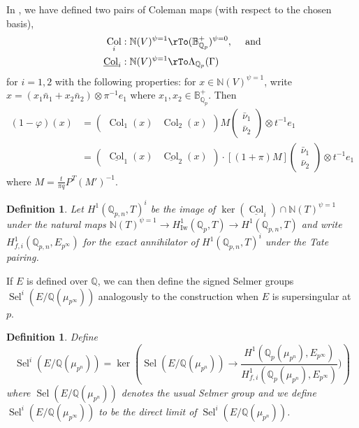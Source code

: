 \documentclass{amsart}
\newcommand{\QQ}{\mathbb Q}
\newcommand{\BB}{\mathbb B}
\newcommand{\NN}{\mathbb N}
\DeclareMathOperator{\Sel}{Sel}
\DeclareMathOperator{\Iw}{Iw}
\DeclareMathOperator{\Col}{Col}
\newcommand{\Ep}{E_{p^\infty}}
\newcommand{\Qp}{\QQ_p}
\newcommand{\vp}{\varphi}
\newtheorem{definition}[theorem]{Definition}
\begin{document}
    In \cite{leiloefflerzerbes10}, we have defined two pairs of Coleman maps (with respect to the chosen basis),  
    \begin{align*}
     \Col_i:\NN(V)^{\psi=1} & \rTo(\BB_{\Qp}^+)^{\psi=0}, \hspace{3ex}\text{and} \\
     \underline{\Col}_i:\NN(V)^{\psi=1} & \rTo\Lambda_{\Qp}(\Gamma)
    \end{align*}
    for $i=1,2$ with the following properties: for $x\in\NN(V)^{\psi=1}$, write $x=(x_1\bar{n}_1+x_2\bar{n}_2)\otimes \pi^{-1}e_1$ where $x_1,x_2\in\BB_{\Qp}^+$. Then
    \begin{align}\label{colemanmaps}
     (1-\vp)(x) & =\begin{pmatrix}\Col_1(x) & \Col_2(x) \end{pmatrix}M\begin{pmatrix}\bar{\nu}_1\\\bar{\nu}_2\end{pmatrix}\otimes t^{-1}e_1 \\
     & =\begin{pmatrix}\underline{\Col}_1(x) & \underline{\Col}_2(x) \end{pmatrix}\cdot[(1+\pi)M]\begin{pmatrix}\bar{\nu}_1\\\bar{\nu}_2\end{pmatrix}\otimes t^{-1}e_1
    \end{align}
    where  $M=\frac{t}{\pi q}P^T(M')^{-1}$.  
    
    \begin{definition}
     Let $H^1(\QQ_{p,n},T)^i$ be the image of $\ker(\underline{\Col}_i)\cap\NN(T)^{\psi=1}$ under the natural maps $\NN(T)^{\psi=1}\rightarrow H^1_{\Iw}(\Qp,T)\rightarrow H^1(\QQ_{p,n},T)$ and write $H^1_{f,i}(\QQ_{p,n},\Ep)$ for the exact annihilator of $H^1(\QQ_{p,n},T)^i$ under the Tate pairing.
    \end{definition}
    
    If $E$ is defined over $\QQ$, we can then define the signed Selmer groups $\Sel^i(E/\QQ(\mu_{p^\infty}))$ analogously to the construction when $E$ is supersingular at $p$.
    
    \begin{definition}
     Define
     \[
     \Sel^i(E/\QQ(\mu_{p^n}))=\ker\left(\Sel(E/\QQ(\mu_{p^n}))\rightarrow \frac{H^1(\Qp(\mu_{p^n}),\Ep)}{H^1_{f,i}(\Qp(\mu_{p^n}),\Ep)})\right)
     \]
     where $\Sel(E/\QQ(\mu_{p^n}))$ denotes the usual Selmer group and we define $\Sel^i(E/\QQ(\mu_{p^\infty}))$ to be the direct limit of $\Sel^i(E/\QQ(\mu_{p^n}))$.     
    \end{definition}
    
\end{document}
